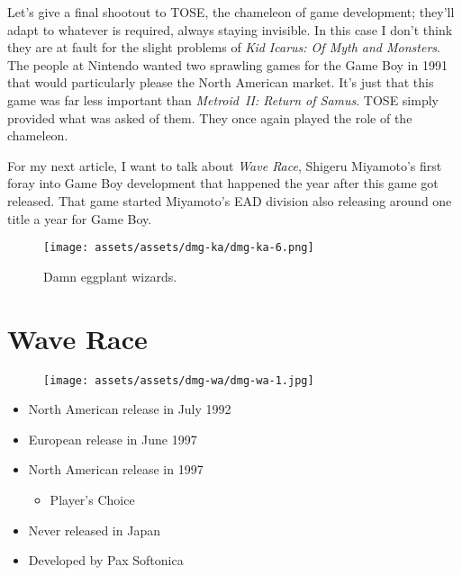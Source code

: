 \documentclass{book}
\begin{document}
Let’s give a final shootout to TOSE, the chameleon of game development; they’ll adapt to whatever is required, always staying invisible. In this case I don’t think they are at fault for the slight problems of \emph{Kid Icarus: Of Myth and Monsters}. The people at Nintendo wanted two sprawling games for the Game Boy in 1991 that would particularly please the North American market. It’s just that this game was far less important than \emph{Metroid II: Return of Samus}. TOSE simply provided what was asked of them. They once again played the role of the chameleon.

For my next article, I want to talk about \emph{Wave Race}, Shigeru Miyamoto’s first foray into Game Boy development that happened the year after this game got released. That game started Miyamoto’s EAD division also releasing around one title a year for Game Boy.

\begin{figure}[hbt]
\vskip 10pt
\centering \texttt{[image: assets/assets/dmg-ka/dmg-ka-6.png]}\par\pagetwodescription Damn eggplant wizards.
\vskip 6pt
\end{figure}



\begingroup \chapter*{Wave Race} \endgroup
\begin{figure}[H]
\vskip 4pt
\centering
\texttt{[image: assets/assets/dmg-wa/dmg-wa-1.jpg]}\end{figure}
\begin{itemize} [nosep]




\item North American release in July 1992







\item European release in June 1997







\item North American release in 1997
\begin{itemize} [nosep]\item Player’s Choice\end{itemize}\noindent







\item Never released in Japan





\item Developed by Pax Softonica

\end{itemize}\noindent
\end{document}
